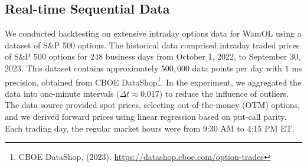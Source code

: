 \documentclass[sigconf, authorversion=true, nonacm=true]{acmart}
\begin{document}
\subsection{Real-time Sequential Data}
\label{subsection: Real Data}
We conducted backtesting on extensive intraday options data for WamOL using a dataset of S\&P 500 options. The historical data comprised intraday traded prices of S\&P 500 options for 248 business days from October 1, 2022, to September 30, 2023. This dataset contains approximately $500,000$ data points per day with $1$ ms precision, obtained from CBOE DataShop\footnote{CBOE DataShop, (2023). \url{https://datashop.cboe.com/option-trades}}. In the experiment, we aggregated the data into one-minute intervals ($\Delta t \approx 0.017$) to reduce the influence of outliers. The data source provided spot prices, selecting out-of-the-money (OTM) options, and we derived forward prices using linear regression based on put-call parity. Each trading day, the regular market hours were from 9:30 AM to 4:15 PM ET.
\end{document}
